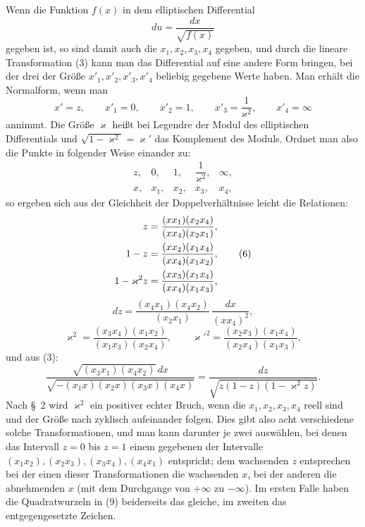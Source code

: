 \documentclass[11pt]{article}
\begin{document}
Wenn die Funktion $f(x)$ in dem elliptischen Differential
\[
du=\frac{dx}{\sqrt{f(x)}}
\]
gegeben ist, so sind damit auch die $x_1,x_2,x_3,x_4$ gegeben, und durch die lineare Transformation (3) kann man das Differential auf eine andere Form bringen, bei der drei der Größe $x'_1,x'_2,x'_3,x'_4$ beliebig gegebene Werte haben. Man erhält die Normalform, wenn man
\[
x'=z,\qquad x'_1=0,\qquad x'_2=1,\qquad x'_3=\frac{1}{\varkappa^2},\qquad x'_4=\infty
\]
annimmt. Die Größe $\varkappa$ heißt bei Legendre der Modul des elliptischen Differentials und $\sqrt{1-\varkappa^2}=\varkappa'$ das Komplement des Moduls. Ordnet man also die Punkte in folgender Weise einander zu:
\[
\begin{array}{ccccc}
z,&0,&1,&\dfrac{1}{\varkappa^2},&\infty,\\[0.4em]
x,&x_1,&x_2,&x_3,&x_4,
\end{array}
\]
so ergeben sich aus der Gleichheit der Doppelverhältnisse leicht die Relationen:
\begin{align}
z&=\frac{(xx_1)(x_2x_4)}{(xx_4)(x_2x_1)},\notag\\
1-z&=\frac{(xx_2)(x_1x_4)}{(xx_4)(x_1x_2)},\tag{6}\\
1-\varkappa^2z&=\frac{(xx_3)(x_1x_4)}{(xx_4)(x_1x_3)},\notag
\end{align}
\begin{equation}
dz=\frac{(x_4x_1)(x_4x_2)}{(x_2x_1)}\,\frac{dx}{(xx_4)^2},
\tag{7}
\end{equation}
\begin{equation}
\varkappa^2=\frac{(x_3x_4)(x_1x_2)}{(x_1x_3)(x_2x_4)},\qquad
\varkappa'^2=\frac{(x_2x_3)(x_1x_4)}{(x_2x_4)(x_1x_3)},
\tag{8}
\end{equation}
und aus (3):
\begin{equation}
\frac{\sqrt{(x_3x_1)(x_4x_2)}\,dx}{\sqrt{-(x_1x)(x_2x)(x_3x)(x_4x)}}=
\frac{dz}{\sqrt{z(1-z)(1-\varkappa^2z)}}.
\tag{9}
\end{equation}
Nach \S~2 wird $\varkappa^2$ ein positiver echter Bruch, wenn die $x_1,x_2,x_3,x_4$ reell sind und der Größe nach zyklisch aufeinander folgen. Dies gibt also acht verschiedene solche Transformationen, und man kann darunter je zwei auswählen, bei denen das Intervall $z=0$ bis $z=1$ einem gegebenen der Intervalle $(x_1x_2),(x_2x_3),(x_3x_4),(x_4x_1)$ entspricht; dem wachsenden $z$ entsprechen bei der einen dieser Transformationen die wachsenden $x$, bei der anderen die abnehmenden $x$ (mit dem Durchgange von $+\infty$ zu $-\infty$). Im ersten Falle haben die Quadratwurzeln in (9) beiderseits das gleiche, im zweiten das entgegengesetzte Zeichen.
\end{document}
